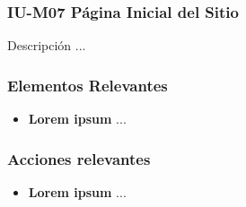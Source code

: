 
\subsubsection{IU-M07 Página Inicial del Sitio}

 Descripción ...


\subsubsection{Elementos Relevantes}

    \begin{itemize}
    \item {\bf Lorem ipsum}
        ...
    \end{itemize}

\subsubsection{Acciones relevantes}

    \begin{itemize}
    \item {\bf Lorem ipsum}
        ...
    \end{itemize}

\clearpage
